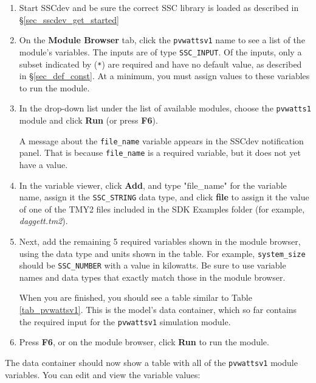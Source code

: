 \documentclass{article}
\begin{document}
\begin{enumerate}
\item Start SSCdev and be sure the correct SSC library is loaded as described in \S\ref{sec_sscdev_get_started}

\item On the \textbf{Module Browser} tab, click the \texttt{pvwattsv1} name to see a list of the module's variables. The inputs are of type \texttt{SSC\_INPUT}. Of the inputs, only a subset indicated by (\texttt{*}) are required and have no default value, as described in \S\ref{sec_def_const}. At a minimum, you must assign values to these variables to run the module.

\item In the drop-down list under the list of available modules, choose the \texttt{pvwatts1} module and click \textbf{Run} (or press \textbf{F6}).

A message about the \texttt{file\_name} variable appears in the SSCdev notification panel. That is because \texttt{file\_name} is a required variable, but it does not yet have a value.

\item In the variable viewer, click \textbf{Add}, and type "file\_name" for the variable name, assign it the \texttt{SSC\_STRING} data type, and click \textbf{file} to assign it the value of one of the TMY2 files included in the SDK Examples folder (for example, \textit{daggett.tm2}).

\item Next, add the remaining 5 required variables shown in the module browser, using the data type and units shown in the table. For example, \texttt{system\_size} should be \texttt{SSC\_NUMBER} with a value in kilowatts. Be sure to use variable names and data types that exactly match those in the module browser.

When you are finished, you should see a table similar to Table \ref{tab_pvwattsv1}. This is the model's data container, which so far contains the required input for the \texttt{pvwattsv1} simulation module.

\item Press \textbf{F6}, or on the module browser, click \textbf{Run} to run the module. 
\end{enumerate}

The data container should now show a table with all of the \texttt{pvwattsv1} module variables. You can edit and view the variable values:
\end{document}
